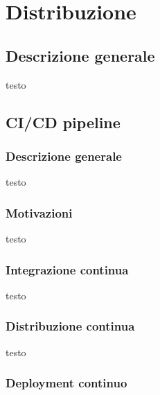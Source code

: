 \chapter{Distribuzione}
\section{Descrizione generale}
testo
\section{CI/CD pipeline}
\subsection{Descrizione generale}
testo
\subsection{Motivazioni}
testo
\subsection{Integrazione continua}
testo
\subsection{Distribuzione continua}
testo
\subsection{Deployment continuo}
